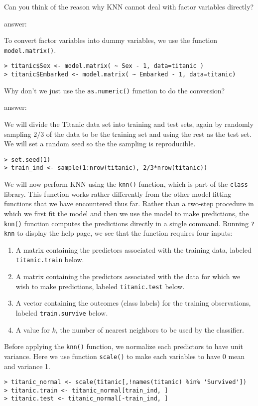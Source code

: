 \documentclass{article}
\newcommand{\answerbox}[1]{
	\begin{center}
		\ifdefined\printsol
			\begin{mdframed}
				\begin{minipage}{0.95\textwidth}
					{\color{blue} {#1}}
				\end{minipage}
			\end{mdframed}
		\else
			\begin{mdframed}
				\begin{minipage}{0.95\textwidth}
					\phantom{\parbox{\linewidth}{#1}}
				\end{minipage}
			\end{mdframed}
		\fi
		\end{center}
	}
\begin{document}
Can you think of the reason why KNN cannot deal with factor variables directly?

\answerbox{
answer:}

To convert
factor variables into dummy variables, we use the function
\texttt{model.matrix()}.

\begin{verbatim}
> titanic$Sex <- model.matrix( ~ Sex - 1, data=titanic )
> titanic$Embarked <- model.matrix( ~ Embarked - 1, data=titanic)
\end{verbatim}

Why don't we just use the \texttt{as.numeric()} function to do the conversion?
\answerbox{
answer:
}

We will divide the Titanic data set into training and test sets, again by randomly sampling $2/3$ of the data to be the training set and using the rest as the test set. We will set a random seed so the the sampling is reproducible.
\begin{Verbatim}[frame=single]
> set.seed(1)
> train_ind <- sample(1:nrow(titanic), 2/3*nrow(titanic))
\end{Verbatim}

We will now perform KNN using the \texttt{knn()} function, which is part of the \texttt{class} library. This function works rather differently from the other model fitting
functions that we have encountered thus far. Rather than a two-step
procedure in which we first fit the model and then we use the model to make
predictions, the \texttt{knn()} function computes the predictions directly in a single command. Running \texttt{?knn} to display the help page, we see that the function requires four inputs:
\begin{enumerate}
\item A matrix containing the predictors associated with the training data,
labeled \texttt{titanic.train} below.
\item A matrix containing the predictors associated with the data for which
we wish to make predictions, labeled \texttt{titanic.test} below.
\item A vector containing the outcomes (class labels) for the training
observations,
labeled \texttt{train.survive} below.
\item A value for $k$, the number of nearest neighbors to be used by the
classifier.
\end{enumerate}

Before applying the \texttt{knn()} function, we normalize each predictors to have unit variance. Here we use function \texttt{scale()} to make each variables to have 0 mean and variance 1.
\begin{Verbatim}[frame=single]
> titanic_normal <- scale(titanic[,!names(titanic) %in% 'Survived'])
> titanic.train <- titanic_normal[train_ind, ]
> titanic.test <- titanic_normal[-train_ind, ]
\end{Verbatim}
\end{document}
